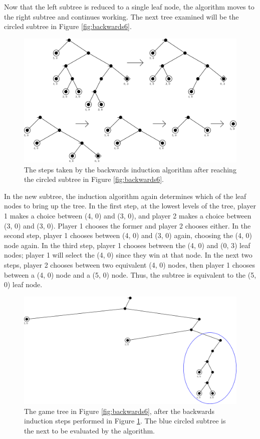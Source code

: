 Now that the left subtree is reduced to a single leaf node, the algorithm moves to the right subtree and continues working. The next tree examined will be the circled subtree in Figure \ref{fig:backwards6}.\\

\begin{figure}[H]
  \centering
  \includegraphics[width=12cm]{figures/Backwards7.png}
  \caption{The steps taken by the backwards induction algorithm after reaching the circled subtree in Figure \ref{fig:backwards6}.}
  \label{fig:backwards7}
\end{figure}

In the new subtree, the induction algorithm again determines which of the leaf nodes to bring up the tree. In the first step, at the lowest levels of the tree, player 1 makes a choice between (4, 0) and (3, 0), and player 2 makes a choice between (3, 0) and (3, 0). Player 1 chooses the former and player 2 chooses either. In the second step, player 1 chooses between (4, 0) and (3, 0) again, choosing the (4, 0) node again. In the third step, player 1 chooses between the (4, 0) and (0, 3) leaf nodes; player 1 will select the (4, 0) since they win at that node. In the next two steps, player 2 chooses between two equivalent (4, 0) nodes, then player 1 chooses between a (4, 0) node and a (5, 0) node. Thus, the subtree is equivalent to the (5, 0) leaf node.\\

\begin{figure}[H]
  \centering
  \includegraphics[width=14cm]{figures/Backwards8.png}
  \caption{The game tree in Figure \ref{fig:backwards6}, after the backwards induction steps performed in Figure \ref{fig:backwards7}. The blue circled subtree is the next to be evaluated by the algorithm.}
  \label{fig:backwards8}
\end{figure}

